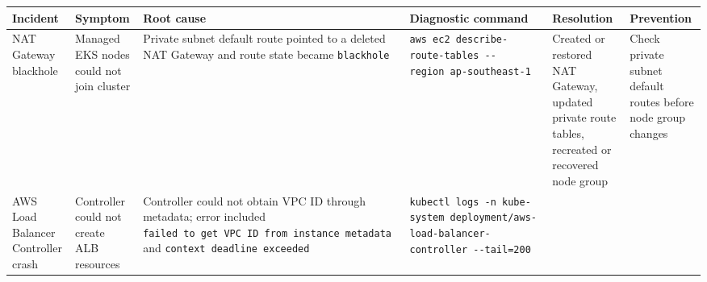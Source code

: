 {
\begingroup
\small
\setlength{\tabcolsep}{3pt}
\renewcommand{\arraystretch}{1.15}
\begin{longtable}{@{}
  >{\raggedright\arraybackslash}p{}
  >{\raggedright\arraybackslash}p{}
  >{\raggedright\arraybackslash}p{}
  >{\raggedright\arraybackslash}p{}
  >{\raggedright\arraybackslash}p{}
  >{\raggedright\arraybackslash}p{}@{}}
\toprule\noalign{}
\begin{minipage}[b]{\linewidth}\raggedright
Incident
\end{minipage} & \begin{minipage}[b]{\linewidth}\raggedright
Symptom
\end{minipage} & \begin{minipage}[b]{\linewidth}\raggedright
Root cause
\end{minipage} & \begin{minipage}[b]{\linewidth}\raggedright
Diagnostic command
\end{minipage} & \begin{minipage}[b]{\linewidth}\raggedright
Resolution
\end{minipage} & \begin{minipage}[b]{\linewidth}\raggedright
Prevention
\end{minipage} \\
\midrule\noalign{}
\endhead
\bottomrule\noalign{}
\endlastfoot
NAT Gateway blackhole & Managed EKS nodes could not join cluster &
Private subnet default route pointed to a deleted NAT Gateway and route
state became \texttt{blackhole} &
\texttt{aws\ ec2\ describe-\allowbreak{}route-\allowbreak{}tables\ -\/\allowbreak{}-region\ ap-\allowbreak{}southeast-\allowbreak{}1} &
Created or restored NAT Gateway, updated private route tables, recreated
or recovered node group & Check private subnet default routes before
node group changes \\
AWS Load Balancer Controller crash & Controller could not create ALB
resources & Controller could not obtain VPC ID through metadata; error
included \texttt{failed\ to\ get\ VPC\ ID\ from\ instance\ metadata} and
\texttt{context\ deadline\ exceeded} &
\texttt{kubectl\ logs\ -n\ kube-\allowbreak{}system\ deployment/\allowbreak{}aws-\allowbreak{}load-\allowbreak{}balancer-\allowbreak{}controller\ -\/\allowbreak{}-tail=200}

\end{longtable}}

